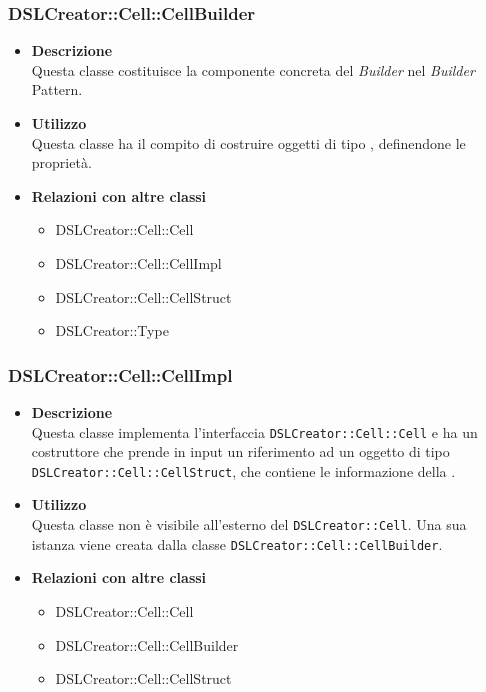  \subsubsection{DSLCreator::Cell::CellBuilder}
                    \begin{itemize}
                        \item \textbf{Descrizione} \hfill \\
                            Questa classe costituisce la componente concreta del \textit{Builder} nel \textit{Builder} Pattern.
                        \item \textbf{Utilizzo} \hfill \\
                            Questa classe ha il compito di costruire oggetti di tipo , definendone le proprietà.
                        \item \textbf{Relazioni con altre classi}
                            \begin{itemize}
                              \item DSLCreator::Cell::Cell
                              \item DSLCreator::Cell::CellImpl
                              \item DSLCreator::Cell::CellStruct
                              \item DSLCreator::Type
                            \end{itemize}
                    \end{itemize}

 \subsubsection{DSLCreator::Cell::CellImpl}
                    \begin{itemize}
                        \item \textbf{Descrizione} \hfill \\
                            Questa classe implementa l'interfaccia \texttt{DSLCreator::Cell::Cell} e ha un costruttore che prende in input un riferimento ad un oggetto di tipo \texttt{DSLCreator::Cell::CellStruct}, che contiene le informazione della .
                        \item \textbf{Utilizzo} \hfill \\
                            Questa classe non è visibile all'esterno del  \texttt{DSLCreator::Cell}. Una sua istanza viene creata dalla classe \texttt{DSLCreator::Cell::CellBuilder}.
                        \item \textbf{Relazioni con altre classi}
                            \begin{itemize}
                              \item DSLCreator::Cell::Cell
                              \item DSLCreator::Cell::CellBuilder
                              \item DSLCreator::Cell::CellStruct
                            \end{itemize}
                    \end{itemize}

